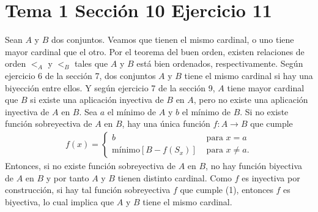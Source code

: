\documentclass{article}
\begin{document}
\section{Tema 1 Sección 10 Ejercicio 11}
Sean $A$ y $B$ dos conjuntos. Veamos que tienen el mismo cardinal, o uno tiene mayor cardinal que el otro. Por el teorema del buen orden, existen relaciones de orden $<_A$ y $<_B$ tales que $A$ y $B$ está bien ordenados, respectivamente. Según ejercicio 6 de la sección 7, dos conjuntos $A$ y $B$ tiene el mismo cardinal si hay una biyección entre ellos. Y según ejercicio 7 de la sección 9, $A$ tiene mayor cardinal que $B$ si existe una aplicación inyectiva de $B$ en $A$, pero no existe una  aplicación inyectiva de $A$ en $B$. Sea $a$ el mínimo de $A$ y $b$ el mínimo de $B$. Si no existe función sobreyectiva de $A$ en $B$, hay una única función $f:A\rightarrow B$ que cumple
\begin{eqnarray}
f(x)=\begin{cases}
b &\text{ para }x=a\\
\text{mínimo}[B-f(S_x)]&\text{ para }x\neq a.
\end{cases}
\end{eqnarray}
Entonces, si no existe función sobreyectiva de $A$ en $B$, no hay función biyectiva de $A$ en $B$ y por tanto $A$ y $B$ tienen distinto cardinal. Como $f$ es inyectiva por construcción, si hay tal función sobreyectiva $f$ que cumple (1), entonces $f$ es biyectiva, lo cual implica que $A$ y $B$ tiene el mismo cardinal.
\end{document}

